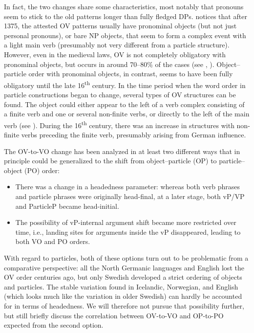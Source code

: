 \documentclass[output=paper]{langscibook}
\begin{document}
In fact, the two changes share some characteristics, most notably that pronouns seem to stick to the old patterns longer than fully fledged DPs. \citet[174]{Delsing1999} notices that after 1375, the attested OV patterns usually have pronominal objects (but not just personal pronouns), or bare NP objects, that seem to form a complex event with a light main verb (presumably not very different from a particle structure). However, even in the medieval laws, OV is not completely obligatory with pronominal objects, but occurs in around 70–80\% of the cases (see \citealt{Delsing1999}, ). Object–particle order with pronominal objects, in contrast, seems to have been fully obligatory until the late 16\textsuperscript{th} century. In the time period when the word order in particle constructions began to change, several types of OV structures can be found. The object could either appear to the left of a verb complex consisting of a finite verb and one or several non-finite verbs, or directly to the left of the main verb (see \citealt{Petzell2011, Petzell2012}). During the 16\textsuperscript{th} century, there was an increase in structures with non-finite verbs preceding the finite verb, presumably arising from German influence.



The OV-to-VO change has been analyzed in at least two different ways that in principle could be generalized to the shift from object–particle (OP) to particle–object (PO) order: 


\begin{itemize}
\item There was a change in a headedness parameter: whereas both verb phrases and particle phrases were originally head-final, at a later stage, both vP/VP and ParticleP became head-initial.
\item The possibility of vP-internal argument shift became more restricted over time, i.e., landing sites for arguments inside the vP disappeared, leading to both VO and PO orders.
\end{itemize}

With regard to particles, both of these options turn out to be problematic from a comparative perspective: all the North Germanic languages and English lost the OV order centuries ago, but only Swedish developed a strict ordering of objects and particles. The stable variation found in Icelandic, Norwegian, and English (which looks much like the variation in older Swedish) can hardly be accounted for in terms of headedness. We will therefore not pursue that possibility further, but still briefly discuss the correlation between OV-to-VO and OP-to-PO expected from the second option.
\end{document}

